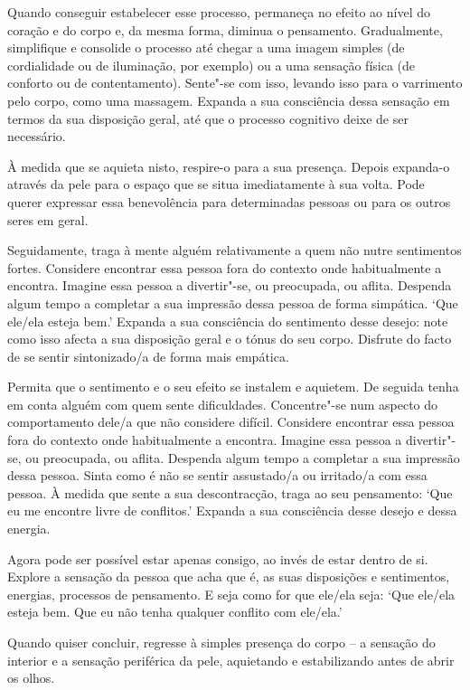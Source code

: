 Quando conseguir estabelecer esse processo, permaneça no efeito ao nível do
coração e do corpo e, da mesma forma, diminua o pensamento. Gradualmente,
simplifique e consolide o processo até chegar a uma imagem simples (de
cordialidade ou de iluminação, por exemplo) ou a uma sensação física (de
conforto ou de contentamento). Sente"-se com isso, levando isso para o varrimento
pelo corpo, como uma massagem. Expanda a sua consciência dessa sensação em
termos da sua disposição geral, até que o processo cognitivo deixe de ser
necessário.

\enlargethispage{2\baselineskip}

À medida que se aquieta nisto, respire-o para a sua presença. Depois expanda-o
através da pele para o espaço que se situa imediatamente à sua volta. Pode
querer expressar essa benevolência para determinadas pessoas ou para os outros
seres em geral.

Seguidamente, traga à mente alguém relativamente a quem não nutre sentimentos
fortes. Considere encontrar essa pessoa fora do contexto onde habitualmente a
encontra. Imagine essa pessoa a divertir"-se, ou preocupada, ou aflita. Despenda
algum tempo a completar a sua impressão dessa pessoa de forma simpática. `Que
ele/ela esteja bem.' Expanda a sua consciência do sentimento desse desejo: note
como isso afecta a sua disposição geral e o tónus do seu corpo. Disfrute do
facto de se sentir sintonizado/a de forma mais empática.

Permita que o sentimento e o seu efeito se instalem e aquietem. De seguida tenha
em conta alguém com quem sente dificuldades. Concentre"-se num aspecto do
comportamento dele/a que não considere difícil. Considere encontrar essa pessoa
fora do contexto onde habitualmente a encontra. Imagine essa pessoa a
divertir"-se, ou preocupada, ou aflita. Despenda algum tempo a completar a sua
impressão dessa pessoa. Sinta como é não se sentir assustado/a ou irritado/a com
essa pessoa. À medida que sente a sua descontracção, traga ao seu pensamento:
`Que eu me encontre livre de conflitos.' Expanda a sua consciência desse desejo
e dessa energia.

Agora pode ser possível estar apenas consigo, ao invés de estar dentro de si.
Explore a sensação da pessoa que acha que é, as suas disposições e sentimentos,
energias, processos de pensamento. E seja como for que ele/ela seja: `Que
ele/ela esteja bem. Que eu não tenha qualquer conflito com ele/ela.'

Quando quiser concluir, regresse à simples presença do corpo -- a sensação do
interior e a sensação periférica da pele, aquietando e estabilizando antes de
abrir os olhos.
